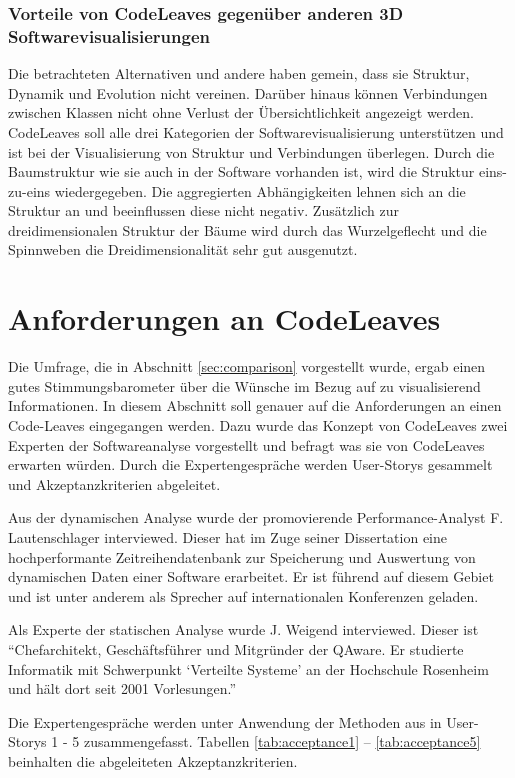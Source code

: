 \subsubsection*{Vorteile von CodeLeaves gegenüber anderen 3D Softwarevisualisierungen}
Die betrachteten Alternativen und andere haben gemein, dass sie Struktur, Dynamik und Evolution nicht vereinen. Darüber hinaus können Verbindungen zwischen Klassen nicht ohne Verlust der Übersichtlichkeit angezeigt werden. CodeLeaves soll alle drei Kategorien der Softwarevisualisierung unterstützen und ist bei der Visualisierung von Struktur und Verbindungen überlegen. Durch die Baumstruktur wie sie auch in der Software vorhanden ist, wird die Struktur eins-zu-eins wiedergegeben. Die aggregierten Abhängigkeiten lehnen sich an die Struktur an und beeinflussen diese nicht negativ. Zusätzlich zur dreidimensionalen Struktur der Bäume wird durch das Wurzelgeflecht und die Spinnweben die Dreidimensionalität sehr gut ausgenutzt.

\section{Anforderungen an CodeLeaves}
\label{sec:requirements}

Die Umfrage, die in Abschnitt \ref{sec:comparison} vorgestellt wurde, ergab einen gutes Stimmungsbarometer über die Wünsche im Bezug auf zu visualisierend Informationen. In diesem Abschnitt soll genauer auf die Anforderungen an einen Code-Leaves eingegangen werden. Dazu wurde das Konzept von CodeLeaves zwei Experten der Softwareanalyse vorgestellt und befragt was sie von CodeLeaves erwarten würden. Durch die Expertengespräche werden User-Storys gesammelt und Akzeptanzkriterien abgeleitet.

Aus der dynamischen Analyse wurde der promovierende Performance-Analyst F. Lautenschlager interviewed. Dieser hat im Zuge seiner Dissertation eine hochperformante Zeitreihendatenbank zur Speicherung und Auswertung von dynamischen Daten einer Software erarbeitet. Er ist führend auf diesem Gebiet und ist unter anderem als Sprecher auf internationalen Konferenzen geladen.

Als Experte der statischen Analyse wurde J. Weigend interviewed. Dieser ist "`Chefarchitekt, Geschäftsführer und Mitgründer der QAware. Er studierte Informatik mit Schwerpunkt \enquote*{Verteilte Systeme} an der Hochschule Rosenheim und hält dort seit 2001 Vorlesungen."' \cite{qaware2017johannes}

Die Expertengespräche werden unter Anwendung der Methoden aus \cite{cohn2004user} in User-Storys 1 - 5 zusammengefasst. Tabellen \ref{tab:acceptance1} -- \ref{tab:acceptance5} beinhalten die abgeleiteten Akzeptanzkriterien.

